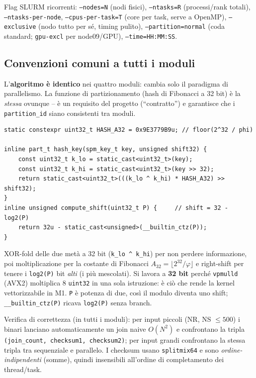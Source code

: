 \documentclass[11pt,a4paper]{article}
\begin{document}
Flag SLURM ricorrenti: \texttt{--nodes=N} (nodi fisici), \texttt{--ntasks=R} (processi/rank totali), \texttt{--ntasks-per-node}, \texttt{--cpus-per-task=T} (core per task, serve a OpenMP), \texttt{--exclusive} (nodo tutto per sé, timing pulito), \texttt{--partition=normal} (coda standard; \texttt{gpu-excl} per node09/GPU), \texttt{--time=HH:MM:SS}.

\subsection{Convenzioni comuni a tutti i moduli}

L'\textbf{algoritmo è identico} nei quattro moduli: cambia solo il paradigma di parallelismo. La funzione di partizionamento (hash di Fibonacci a 32 bit) è la \emph{stessa} ovunque -- è un requisito del progetto (``contratto'') e garantisce che i \texttt{partition\_id} siano consistenti tra moduli.

\begin{lstlisting}[style=cpp, caption={La hash di partizionamento condivisa (include/common.hpp), usata in M1--M4.}]
static constexpr uint32_t HASH_A32 = 0x9E3779B9u; // floor(2^32 / phi)

inline part_t hash_key(spm_key_t key, unsigned shift32) {
    const uint32_t k_lo = static_cast<uint32_t>(key);
    const uint32_t k_hi = static_cast<uint32_t>(key >> 32);
    return static_cast<uint32_t>(((k_lo ^ k_hi) * HASH_A32) >> shift32);
}
inline unsigned compute_shift(uint32_t P) {     // shift = 32 - log2(P)
    return 32u - static_cast<unsigned>(__builtin_ctz(P));
}
\end{lstlisting}

\begin{whybox}
XOR-fold delle due metà a 32 bit (\texttt{k\_lo \^{} k\_hi}) per non perdere informazione, poi moltiplicazione per la costante di Fibonacci $A_{32}=\lfloor 2^{32}/\varphi\rfloor$ e right-shift per tenere i \texttt{log2(P)} bit \emph{alti} (i più mescolati). Si lavora a \textbf{32 bit} perché \texttt{vpmulld} (AVX2) moltiplica 8 \texttt{uint32} in una sola istruzione: è ciò che rende la kernel vettorizzabile in M1. \texttt{P} è potenza di due, così il modulo diventa uno shift; \texttt{\_\_builtin\_ctz(P)} ricava \texttt{log2(P)} senza branch.
\end{whybox}

Verifica di correttezza (in tutti i moduli): per input piccoli (NR, NS $\le 500$) i binari lanciano automaticamente un join naive $O(N^2)$ e confrontano la tripla \texttt{(join\_count, checksum1, checksum2)}; per input grandi confrontano la stessa tripla tra sequenziale e parallelo. I checksum usano \texttt{splitmix64} e sono \emph{ordine-indipendenti} (somme), quindi insensibili all'ordine di completamento dei thread/task.
\end{document}
